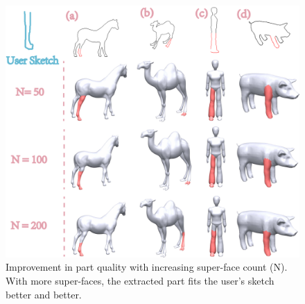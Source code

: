 \begin{figure}\centering
\includegraphics[width=1.0\linewidth]{./Material/SFGNVary.pdf}
\caption{Improvement in part quality with increasing super-face count (N). With more super-faces, the extracted part fits the user's sketch better and better.}
\label{fig:SFCountsPartQuality}
\end{figure}


